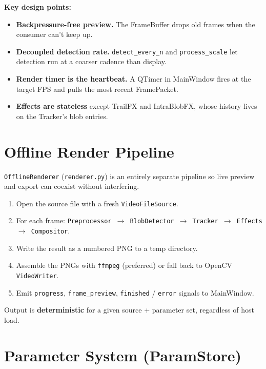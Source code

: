 \documentclass[11pt,a4paper,openany]{report}
\begin{document}
\textbf{Key design points:}

\begin{itemize}
    \item \textbf{Backpressure-free preview.} The FrameBuffer drops old
        frames when the consumer can't keep up.
    \item \textbf{Decoupled detection rate.} \texttt{detect\_every\_n} and
        \texttt{process\_scale} let detection run at a coarser cadence than
        display.
    \item \textbf{Render timer is the heartbeat.} A QTimer in MainWindow
        fires at the target FPS and pulls the most recent FramePacket.
    \item \textbf{Effects are stateless} except TrailFX and IntraBlobFX,
        whose history lives on the Tracker's blob entries.
\end{itemize}

\section{Offline Render Pipeline}

\texttt{OfflineRenderer} (\texttt{renderer.py}) is an entirely separate
pipeline so live preview and export can coexist without interfering.

\begin{enumerate}
    \item Open the source file with a fresh \texttt{VideoFileSource}.
    \item For each frame: \texttt{Preprocessor $\rightarrow$ BlobDetector
        $\rightarrow$ Tracker $\rightarrow$ Effects $\rightarrow$ Compositor}.
    \item Write the result as a numbered PNG to a temp directory.
    \item Assemble the PNGs with \texttt{ffmpeg} (preferred) or fall back to
        OpenCV \texttt{VideoWriter}.
    \item Emit \texttt{progress}, \texttt{frame\_preview},
        \texttt{finished} / \texttt{error} signals to MainWindow.
\end{enumerate}

Output is \textbf{deterministic} for a given source + parameter set,
regardless of host load.

\section{Parameter System (ParamStore)}
\end{document}

